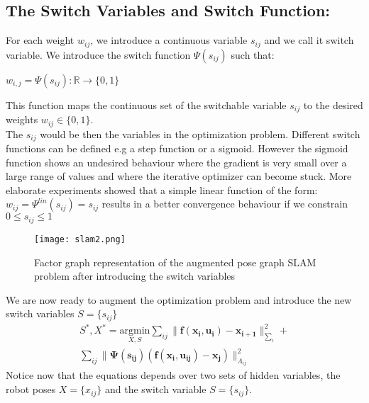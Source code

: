 \documentclass[9pt,technote]{IEEEtran}
\begin{document}
\subsection{The Switch Variables and Switch Function:}
For each weight $w_{ij}$, we introduce a continuous variable $s_{ij}$ and we call it switch variable.
We introduce the switch function $\Psi{ (s_{ij}) }$ such that: 
\begin{center}
$ w_{i,j} = \Psi{ (s_{ij}) } : \mathbb{R} \rightarrow \{0,1\}$
\end{center}
This function maps the continuous set of the switchable variable $s_{ij}$ to the desired weights $w_{ij} \in \{ 0,1 \}.$\\ 
The $s_{ij}$ would be then the variables in the  optimization problem.
Different switch functions can be defined e.g a step function or a sigmoid. However the sigmoid function shows an undesired behaviour where  the  gradient is  very  small  over  a  large  range  of  values and  where  the
iterative optimizer can become stuck.
More  elaborate experiments  showed  that  a  simple  linear function of the form: $w_{ij} = \Psi^{lin}(s_{ij}) = s_{ij}$ results  in  a  better  convergence
behaviour if we constrain $ 0 \leq s_{ij} \leq 1$ \\ 
\begin{figure}[h!]
  \centering
  \texttt{[image: slam2.png]}
  \caption{Factor graph representation of the augmented pose graph SLAM problem after  introducing  the  switch  variables}
\end{figure}
\newline
We are now ready to augment the optimization problem and  introduce the new switch variables $S = \{s_{ij}\}$
\begin{multline}
S^*, X^* = 
\underset{X,S}{\mathrm{argmin}}
 \sum_{ij} \lVert \mathbf{f(x_i,u_{i}) - x_{i+1}}\rVert _{\sum_{i}} ^{2} + \\ 
\sum_{ij}\lVert \mathbf{\Psi(s_{ij})  (f(x_i,u_{ij}) - x_j)}\rVert _{\Lambda_{ij}} ^{2}     
\end{multline}
Notice now that the equations depends over two sets of hidden variables, the robot poses $X=\{ x_{ij} \}$ and the switch variable $S = \{s_{ij}\}$.
\end{document}

